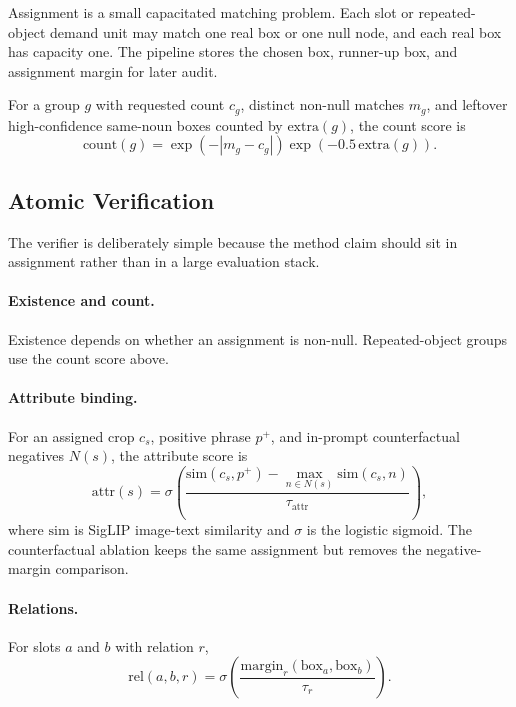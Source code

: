 \documentclass{article}
\begin{document}
Assignment is a small capacitated matching problem. Each slot or repeated-object demand unit may match one real box or one null node, and each real box has capacity one. The pipeline stores the chosen box, runner-up box, and assignment margin for later audit.

For a group $g$ with requested count $c_g$, distinct non-null matches $m_g$, and leftover high-confidence same-noun boxes counted by $\mathrm{extra}(g)$, the count score is
\begin{equation}
\mathrm{count}(g) = \exp(-|m_g-c_g|)\exp(-0.5\,\mathrm{extra}(g)).
\end{equation}

\subsection{Atomic Verification}

The verifier is deliberately simple because the method claim should sit in assignment rather than in a large evaluation stack.

\paragraph{Existence and count.}
Existence depends on whether an assignment is non-null. Repeated-object groups use the count score above.

\paragraph{Attribute binding.}
For an assigned crop $c_s$, positive phrase $p^{+}$, and in-prompt counterfactual negatives $N(s)$, the attribute score is
\begin{equation}
\mathrm{attr}(s) =
\sigma\left(
\frac{\mathrm{sim}(c_s,p^{+}) - \max_{n\in N(s)} \mathrm{sim}(c_s,n)}
{\tau_{\mathrm{attr}}}
\right),
\end{equation}
where $\mathrm{sim}$ is SigLIP image-text similarity and $\sigma$ is the logistic sigmoid. The counterfactual ablation keeps the same assignment but removes the negative-margin comparison.

\paragraph{Relations.}
For slots $a$ and $b$ with relation $r$,
\begin{equation}
\mathrm{rel}(a,b,r) =
\sigma\left(\frac{\mathrm{margin}_r(\mathrm{box}_a,\mathrm{box}_b)}{\tau_r}\right).
\end{equation}
\end{document}
